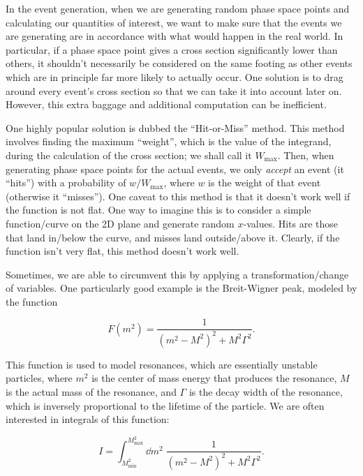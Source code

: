 In the event generation, when we are generating random phase space points and calculating our quantities of interest, we want to make sure that the events we are generating are in accordance with what would happen in the real world. In particular, if a phase space point gives a cross section significantly lower than others, it shouldn't necessarily be considered on the same footing as other events which are in principle far more likely to actually occur. One solution is to drag around every event's cross section so that we can take it into account later on. However, this extra baggage and additional computation can be inefficient.

One highly popular solution is dubbed the ``Hit-or-Miss'' method. This method involves finding the maximum ``weight'', which is the value of the integrand, during the calculation of the cross section; we shall call it $W_{\mathrm{max}}$. Then, when generating phase space points for the actual events, we only \textit{accept} an event (it ``hits'') with a probability of $w/W_{\mathrm{max}}$, where $w$ is the weight of that event (otherwise it ``misses''). One caveat to this method is that it doesn't work well if the function is not flat. One way to imagine this is to consider a simple function/curve on the 2D plane and generate random $x$-values. Hits are those that land in/below the curve, and misses land outside/above it. Clearly, if the function isn't very flat, this method doesn't work well.

Sometimes, we are able to circumvent this by applying a transformation/change of variables. One particularly good example is the Breit-Wigner peak, modeled by the function

\begin{equation}
  F(m^2) = \frac{1}{(m^2 - M^2)^2 + M^2\Gamma^2}.
\end{equation}

This function is used to model resonances, which are essentially unstable particles, where $m^2$ is the center of mass energy that produces the resonance, $M$ is the actual mass of the resonance, and $\Gamma$ is the decay width of the resonance, which is inversely proportional to the lifetime of the particle. We are often interested in integrals of this function:

\begin{equation}
  I = \int_{M_{\mathrm{min}}^2}^{M_{\mathrm{max}}^2} \dd m^2 \; \frac{1}{(m^2 - M^2)^2 + M^2\Gamma^2}.
\end{equation}


